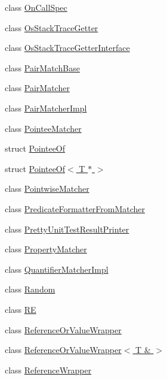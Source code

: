 \begin{DoxyCompactItemize}
\item 
class \hyperlink{classtesting_1_1internal_1_1OnCallSpec}{On\+Call\+Spec}
\item 
class \hyperlink{classtesting_1_1internal_1_1OsStackTraceGetter}{Os\+Stack\+Trace\+Getter}
\item 
class \hyperlink{classtesting_1_1internal_1_1OsStackTraceGetterInterface}{Os\+Stack\+Trace\+Getter\+Interface}
\item 
class \hyperlink{classtesting_1_1internal_1_1PairMatchBase}{Pair\+Match\+Base}
\item 
class \hyperlink{classtesting_1_1internal_1_1PairMatcher}{Pair\+Matcher}
\item 
class \hyperlink{classtesting_1_1internal_1_1PairMatcherImpl}{Pair\+Matcher\+Impl}
\item 
class \hyperlink{classtesting_1_1internal_1_1PointeeMatcher}{Pointee\+Matcher}
\item 
struct \hyperlink{structtesting_1_1internal_1_1PointeeOf}{Pointee\+Of}
\item 
struct \hyperlink{structtesting_1_1internal_1_1PointeeOf_3_01T_01_5_01_4}{Pointee\+Of$<$ T $\ast$ $>$}
\item 
class \hyperlink{classtesting_1_1internal_1_1PointwiseMatcher}{Pointwise\+Matcher}
\item 
class \hyperlink{classtesting_1_1internal_1_1PredicateFormatterFromMatcher}{Predicate\+Formatter\+From\+Matcher}
\item 
class \hyperlink{classtesting_1_1internal_1_1PrettyUnitTestResultPrinter}{Pretty\+Unit\+Test\+Result\+Printer}
\item 
class \hyperlink{classtesting_1_1internal_1_1PropertyMatcher}{Property\+Matcher}
\item 
class \hyperlink{classtesting_1_1internal_1_1QuantifierMatcherImpl}{Quantifier\+Matcher\+Impl}
\item 
class \hyperlink{classtesting_1_1internal_1_1Random}{Random}
\item 
class \hyperlink{classtesting_1_1internal_1_1RE}{RE}
\item 
class \hyperlink{classtesting_1_1internal_1_1ReferenceOrValueWrapper}{Reference\+Or\+Value\+Wrapper}
\item 
class \hyperlink{classtesting_1_1internal_1_1ReferenceOrValueWrapper_3_01T_01_6_01_4}{Reference\+Or\+Value\+Wrapper$<$ T \& $>$}
\item 
class \hyperlink{classtesting_1_1internal_1_1ReferenceWrapper}{Reference\+Wrapper}
\item 

\end{DoxyCompactItemize}
